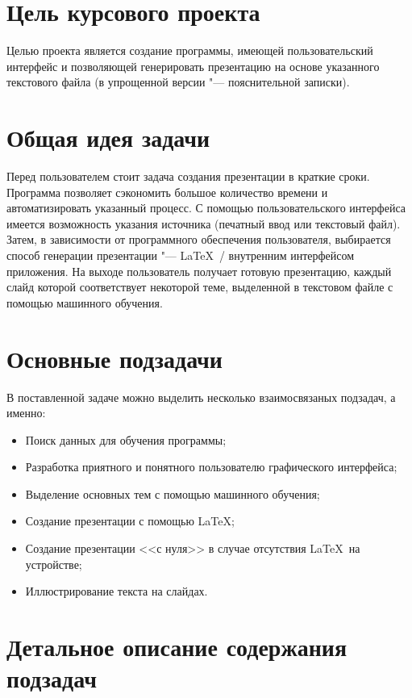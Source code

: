  \hypertarget{intro}{}
  \tableofcontents
  \newpage

  \section{Цель курсового проекта}

  Целью проекта является создание программы, имеющей пользовательский интерфейс 
  и позволяющей генерировать презентацию на основе указанного текстового файла 
  (в упрощенной версии "--- пояснительной записки). 

  \section{Общая идея задачи}

  Перед пользователем стоит задача создания презентации в краткие сроки.
  Программа позволяет сэкономить большое количество времени и автоматизировать указанный процесс.
  С помощью пользовательского интерфейса имеется возможность указания источника
  (печатный ввод или текстовый файл). Затем, в зависимости от программного обеспечения пользователя,
  выбирается способ генерации презентации "--- \LaTeX~/ внутренним интерфейсом приложения.
  На выходе пользователь получает готовую презентацию, каждый слайд которой соответствует 
  некоторой теме, выделенной в текстовом файле с помощью машинного обучения.

  \section{Основные подзадачи}

  В поставленной задаче можно выделить несколько взаимосвязаных подзадач, а именно:
  \begin{itemize}
    \item Поиск данных для обучения программы;
    \item Разработка приятного и понятного пользователю графического интерфейса;
    \item Выделение основных тем с помощью машинного обучения;
    \item Создание презентации с помощью \LaTeX;
    \item Создание презентации <<с нуля>> в случае отсутствия \LaTeX~на устройстве;
    \item Иллюстрирование текста на слайдах. 
  \end{itemize}

  \section{Детальное описание содержания подзадач}

